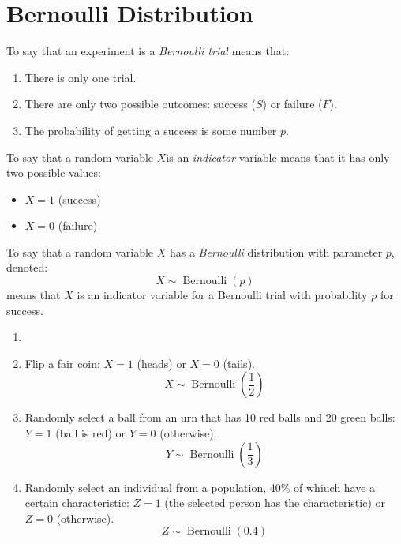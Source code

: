 \documentclass[letterpaper,12pt,fleqn]{article}
\DeclareMathOperator{\bern}{Bernoulli}
\begin{document}
\section*{Bernoulli Distribution}

\begin{definition}
  To say that an experiment is a \emph{Bernoulli trial} means that:
  \begin{enumerate}
  \item There is only one trial.
  \item There are only two possible outcomes: success (\(S\)) or failure (\(F\)).
  \item The probability of getting a success is some number \(p\).
  \end{enumerate}
\end{definition}

\begin{definition}
  To say that a random variable \(X\)is an \emph{indicator} variable means that it has only two possible values:
  \begin{itemize}
    \item \(X=1\) (success)
    \item \(X=0\) (failure)
  \end{itemize}
\end{definition}

\begin{definition}
  To say that a random variable \(X\) has a \emph{Bernoulli} distribution with parameter \(p\), denoted:
  \[X\sim\bern(p)\]
  means that \(X\) is an indicator variable for a Bernoulli trial with probability \(p\) for success.
\end{definition}

\begin{examples}
  \begin{enumerate}
  \item[]
  \item Flip a fair coin: \(X=1\) (heads) or \(X=0\) (tails).
    \[X\sim\bern\left(\frac{1}{2}\right)\]
  \item Randomly select a ball from an urn that has 10 red balls and 20 green balls: \(Y=1\) (ball is red) or \(Y=0\)
    (otherwise).
    \[Y\sim\bern\left(\frac{1}{3}\right)\]
  \item Randomly select an individual from a population, 40\% of whiuch have a certain characteristic: \(Z=1\) (the selected
    person has the characteristic) or \(Z=0\) (otherwise).
    \[Z\sim\bern\left(0.4\right)\]
  \end{enumerate}
\end{examples}
\end{document}
